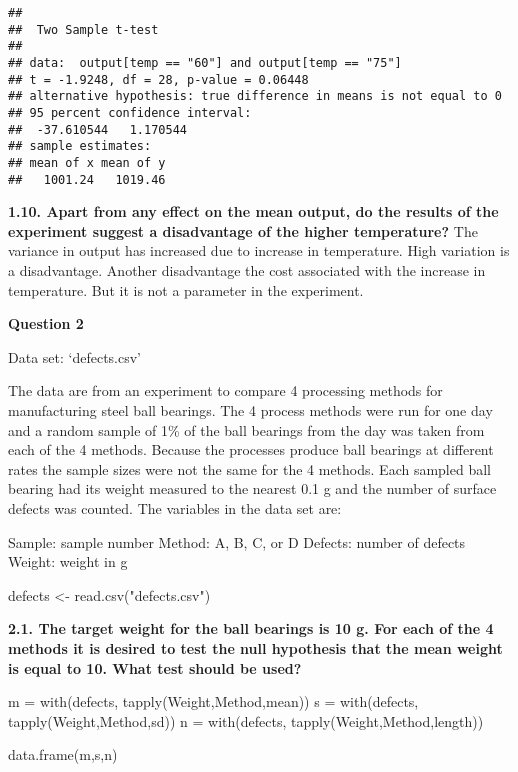 \documentclass[
]{article}
\newenvironment{Shaded}{\begin{snugshade}}{\end{snugshade}}
\newcommand{\FunctionTok}[1]{\textcolor[rgb]{0.00,0.00,0.00}{#1}}
\newcommand{\NormalTok}[1]{#1}
\newcommand{\OtherTok}[1]{\textcolor[rgb]{0.56,0.35,0.01}{#1}}
\newcommand{\StringTok}[1]{\textcolor[rgb]{0.31,0.60,0.02}{#1}}
\begin{document}
\begin{verbatim}
## 
##  Two Sample t-test
## 
## data:  output[temp == "60"] and output[temp == "75"]
## t = -1.9248, df = 28, p-value = 0.06448
## alternative hypothesis: true difference in means is not equal to 0
## 95 percent confidence interval:
##  -37.610544   1.170544
## sample estimates:
## mean of x mean of y 
##   1001.24   1019.46
\end{verbatim}

\textbf{1.10. Apart from any effect on the mean output, do the results
of the experiment suggest a disadvantage of the higher temperature?} The
variance in output has increased due to increase in temperature. High
variation is a disadvantage. Another disadvantage the cost associated
with the increase in temperature. But it is not a parameter in the
experiment.

\textbf{Question 2}

Data set: `defects.csv'

The data are from an experiment to compare 4 processing methods for
manufacturing steel ball bearings. The 4 process methods were run for
one day and a random sample of 1\% of the ball bearings from the day was
taken from each of the 4 methods. Because the processes produce ball
bearings at different rates the sample sizes were not the same for the 4
methods. Each sampled ball bearing had its weight measured to the
nearest 0.1 g and the number of surface defects was counted. The
variables in the data set are:

Sample: sample number Method: A, B, C, or D Defects: number of defects
Weight: weight in g

\begin{Shaded}
\begin{Highlighting}[]
\NormalTok{defects }\OtherTok{\textless{}{-}} \FunctionTok{read.csv}\NormalTok{(}\StringTok{"defects.csv"}\NormalTok{)}
\end{Highlighting}
\end{Shaded}

\textbf{2.1. The target weight for the ball bearings is 10 g. For each
of the 4 methods it is desired to test the null hypothesis that the mean
weight is equal to 10. What test should be used?}

\begin{Shaded}
\begin{Highlighting}[]
\NormalTok{m }\OtherTok{=} \FunctionTok{with}\NormalTok{(defects, }\FunctionTok{tapply}\NormalTok{(Weight,Method,mean))}
\NormalTok{s }\OtherTok{=} \FunctionTok{with}\NormalTok{(defects, }\FunctionTok{tapply}\NormalTok{(Weight,Method,sd))}
\NormalTok{n }\OtherTok{=} \FunctionTok{with}\NormalTok{(defects, }\FunctionTok{tapply}\NormalTok{(Weight,Method,length))}

\FunctionTok{data.frame}\NormalTok{(m,s,n)}
\end{Highlighting}
\end{Shaded}
\end{document}
